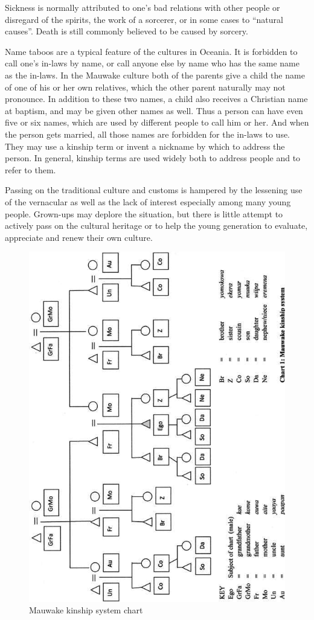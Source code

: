 Sickness is normally attributed to one's bad relations with other people or disregard of the spirits, the work of a sorcerer, or in some cases to ``natural causes''. Death is still commonly believed to be caused by sorcery.

Name taboos are a typical feature of the cultures in Oceania.  It is forbidden to call one's in-laws by name, or call anyone else by name who has the same name as the in-laws.  In the Mauwake culture both of the parents give a child the name of one of his or her own relatives, which the other parent naturally may not pronounce.  In addition to these two names, a child also receives a Christian name at baptism, and may be given other names as well.  Thus a person can have even five or six names, which are used by different people to call him or her.  And when the person gets married, all those names are forbidden for the in-laws to use.  They may use a kinship term or invent a nickname by which to address the person. In general, kinship terms are used widely both to address people and to refer to them.

Passing on the traditional culture and customs is hampered by the lessening use of the vernacular as well as the lack of interest especially among many young people. Grown-ups may deplore the situation, but there is little attempt to actively pass on the cultural heritage or to help the young generation to evaluate, appreciate and renew their own culture. 



\begin{figure}
\includegraphics[width=12cm]{figures/1-mauwake_kinship_system_chart.png}
\caption{Mauwake kinship system chart}
\label{fig:1:kinship}
\end{figure}
 



